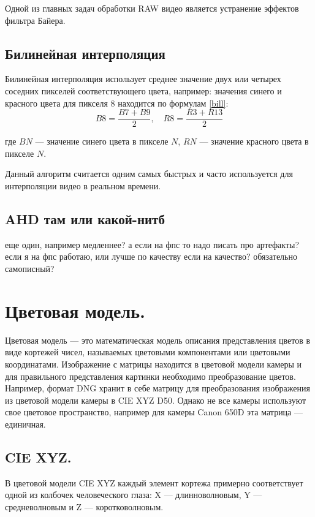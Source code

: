 Одной из главных задач обработки RAW видео является устранение эффектов фильтра Байера.


\subsection{Билинейная интерполяция}
Билинейная интерполяция использует среднее значение двух или четырех соседних пикселей соответствующего цвета, например: значения синего и красного цвета для пикселя 8 находится по формулам \ref{bill}:
\begin{equation}
	\label{bill}
	B8 = \frac{B7 + B9}{2},
	\quad	
	R8 = \frac{R3 + R13}{2}
\end{equation}

где $BN$ --- значение синего цвета в пикселе $N$, $RN$ --- значение красного цвета в пикселе $N$.

Данный алгоритм считается одним самых быстрых и часто используется для интерполяции видео в реальном времени.

\subsection{AHD там или какой-нитб}

еще один, например медленнее?
а если на фпс то надо писать про артефакты?
если я на фпс работаю, или лучше по качеству если на качество? обязательно самописный?

\section{Цветовая модель.}
Цветовая модель --- это математическая модель описания представления цветов в виде кортежей чисел, называемых цветовыми компонентами или цветовыми координатами. Изображение с матрицы находится в цветовой модели камеры и для правильного представления картинки необходимо преобразование цветов. Например, формат DNG хранит в себе матрицу для преобразования изображения из цветовой модели камеры в CIE XYZ D50. Однако не все камеры используют свое цветовое пространство, например для камеры Canon 650D эта матрица --- единичная.

\subsection{CIE XYZ.}
В цветовой модели CIE XYZ каждый элемент кортежа примерно соответствует одной из колбочек человеческого глаза: X --- длинноволновым, Y --- средневолновым и Z --- коротковолновым.

